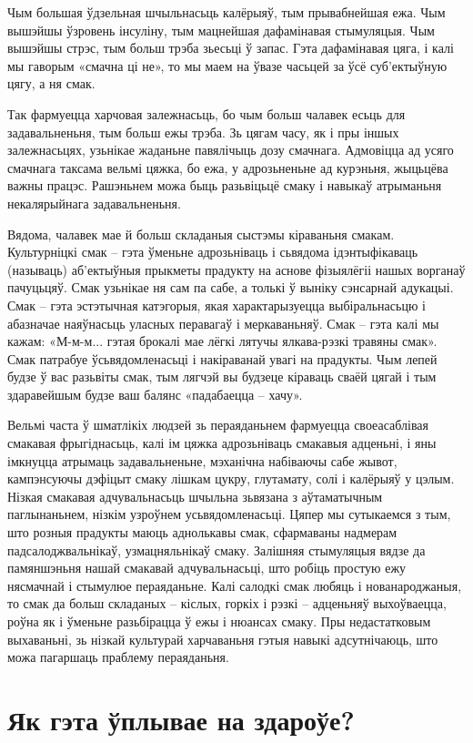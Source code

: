 Чым большая ўдзельная шчыльнасьць калёрыяў, тым прывабнейшая ежа. Чым вышэйшы ўзровень інсуліну, тым мацнейшая дафамінавая стымуляцыя. Чым вышэйшы стрэс, тым больш трэба зьесьці ў запас. Гэта дафамінавая цяга, і калі мы гаворым «смачна ці не», то мы маем на ўвазе часьцей за ўсё суб'ектыўную цягу, а ня смак.

Так фармуецца харчовая залежнасьць, бо чым больш чалавек есьць для задавальненьня, тым больш ежы трэба. Зь цягам часу, як і пры іншых залежнасьцях, узьнікае жаданьне павялічыць дозу смачнага. Адмовіцца ад усяго смачнага таксама вельмі цяжка, бо ежа, у адрозьненьне ад курэньня, жыцьцёва важны працэс. Рашэньнем можа быць разьвіцьцё смаку і навыкаў атрыманьня некалярыйнага задавальненьня.

Вядома, чалавек мае й больш складаныя сыстэмы кіраваньня смакам. Культурніцкі смак – гэта ўменьне адрозьніваць і сьвядома ідэнтыфікаваць (называць) аб'ектыўныя прыкметы прадукту на аснове фізыялёгіі нашых ворганаў пачуцьцяў. Смак узьнікае ня сам па сабе, а толькі ў выніку сэнсарнай адукацыі. Смак – гэта эстэтычная катэгорыя, якая характарызуецца выбіральнасьцю і абазначае наяўнасьць уласных перавагаў і меркаваньняў. Смак – гэта калі мы кажам: «М-м-м... гэтая брокалі мае лёгкі лятучы ялкава-рэзкі травяны смак». Смак патрабуе ўсьвядомленасьці і накіраванай увагі на прадукты. Чым лепей будзе ў вас разьвіты смак, тым лягчэй вы будзеце кіраваць сваёй цягай і тым здаравейшым будзе ваш балянс «падабаецца – хачу».

Вельмі часта ў шматлікіх людзей зь пераяданьнем фармуецца своеасаблівая смакавая фрыгіднасьць, калі ім цяжка адрозьніваць смакавыя адценьні, і яны імкнуцца атрымаць задавальненьне, мэханічна набіваючы сабе жывот, кампэнсуючы дэфіцыт смаку лішкам цукру, глутамату, солі і калёрыяў у цэлым. Нізкая смакавая адчувальнасьць шчыльна зьвязана з аўтаматычным паглынаньнем, нізкім узроўнем усьвядомленасьці. Цяпер мы сутыкаемся з тым, што розныя прадукты маюць аднолькавы смак, сфармаваны надмерам падсалоджвальнікаў, узмацняльнікаў смаку. Залішняя стымуляцыя вядзе да памяншэньня нашай смакавай адчувальнасьці, што робіць простую ежу нясмачнай і стымулюе пераяданьне. Калі салодкі смак любяць і нованароджаныя, то смак да больш складаных – кіслых, горкіх і рэзкі – адценьняў выхоўваецца, роўна як і ўменьне разьбірацца ў ежы і нюансах смаку. Пры недастатковым выхаваньні, зь нізкай культурай харчаваньня гэтыя навыкі адсутнічаюць, што можа пагаршаць праблему пераяданьня.

\section{Як гэта ўплывае на здароўе?}

